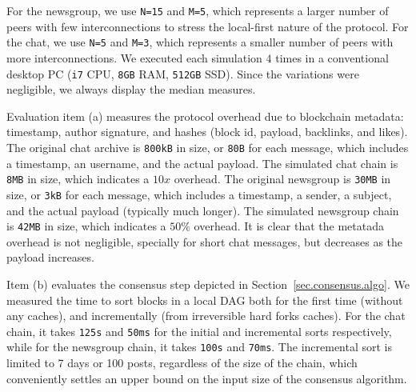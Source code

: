 \documentclass[10pt,journal,compsoc]{IEEEtran}
\newcommand{\FC}       {Freechains\xspace}
\newcommand{\code}[1]  {\texttt{\footnotesize{#1}}}
\begin{document}
For the newsgroup, we use \texttt{N=15} and \texttt{M=5}, which represents a
larger number of peers with few interconnections to stress the local-first
nature of the protocol.
For the chat, we use \texttt{N=5} and \texttt{M=3}, which represents a smaller
number of peers with more interconnections.
%
We executed each simulation $4$ times in a conventional desktop PC (\texttt{i7}
CPU, \texttt{8GB} RAM, \texttt{512GB} SSD).
Since the variations were negligible, we always display the median measures.

Evaluation item (a) measures the protocol overhead due to blockchain metadata:
timestamp, author signature, and hashes (block id, payload, backlinks, and
likes).
%
The original chat archive is \texttt{800kB} in size, or \texttt{80B} for each
message, which includes a timestamp, an username, and the actual payload.
The simulated chat chain is \texttt{8MB} in size, which indicates a $10x$
overhead.
The original newsgroup is \texttt{30MB} in size, or \texttt{3kB} for each
message, which includes a timestamp, a sender, a subject, and the actual
payload (typically much longer).
The simulated newsgroup chain is \texttt{42MB} in size, which indicates a
$50\%$ overhead.
%
It is clear that the metatada overhead is not negligible, specially for short
chat messages, but decreases as the payload increases.

Item (b) evaluates the consensus step depicted in
Section~\ref{sec.consensus.algo}.
We measured the time to sort blocks in a local DAG both for the first time
(without any caches), and incrementally (from irreversible hard forks caches).
%
For the chat chain, it takes \texttt{125s} and \texttt{50ms} for the initial
and incremental sorts respectively, while for the newsgroup chain, it takes
\texttt{100s} and \texttt{70ms}.
%
%
The incremental sort is limited to 7 days or 100 posts, regardless of the size
of the chain, which conveniently settles an upper bound on the input size of
the consensus algorithm.
\end{document}
